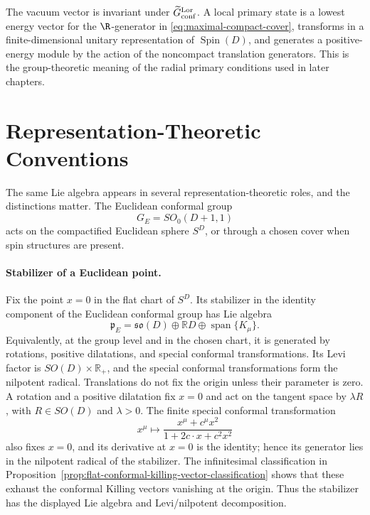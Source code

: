 \begin{definition}
\label{def:local-primary-state}
The vacuum vector is invariant under
\(\widetilde G_{\rm conf}^{\rm Lor}\).  A local primary state is a lowest
energy vector for the \(\R\)-generator in
\eqref{eq:maximal-compact-cover}, transforms in a finite-dimensional unitary
representation of \(\operatorname{Spin}(D)\), and generates a positive-energy
module by the action of the noncompact translation generators.  This is the
group-theoretic meaning of the radial primary conditions used in later
chapters.
\end{definition}

\section{Representation-Theoretic Conventions}
\label{sec:conformal-representation-theoretic-conventions}

The same Lie algebra appears in several representation-theoretic roles, and
the distinctions matter.  The Euclidean conformal group
\[
  G_E=SO_0(D+1,1)
\]
acts on the compactified Euclidean sphere \(S^D\), or through a chosen cover
when spin structures are present.

\paragraph{Stabilizer of a Euclidean point.}
Fix the point \(x=0\) in the flat chart of \(S^D\).  Its stabilizer in the
identity component of the Euclidean conformal group has Lie algebra
\[
  \mathfrak p_E
  =
  \mathfrak{so}(D)\oplus\mathbb R D\oplus
  \operatorname{span}\{K_\mu\}.
\]
Equivalently, at the group level and in the chosen chart, it is generated by
rotations, positive dilatations, and special conformal transformations.  Its
Levi factor is \(SO(D)\times\mathbb R_+\), and the special conformal
transformations form the nilpotent radical.
Translations do not fix the origin unless their parameter is zero.  A rotation
and a positive dilatation fix \(x=0\) and act on the tangent space by
\(\lambda R\), with \(R\in SO(D)\) and \(\lambda>0\).  The finite special
conformal transformation
\[
  x^\mu\mapsto
  \frac{x^\mu+c^\mu x^2}{1+2c\cdot x+c^2x^2}
\]
also fixes \(x=0\), and its derivative at \(x=0\) is the identity; hence its
generator lies in the nilpotent radical of the stabilizer.  The infinitesimal
classification in Proposition~\ref{prop:flat-conformal-killing-vector-classification}
shows that these exhaust the conformal Killing vectors vanishing at the
origin.  Thus the stabilizer has the displayed Lie algebra and
Levi/nilpotent decomposition.

